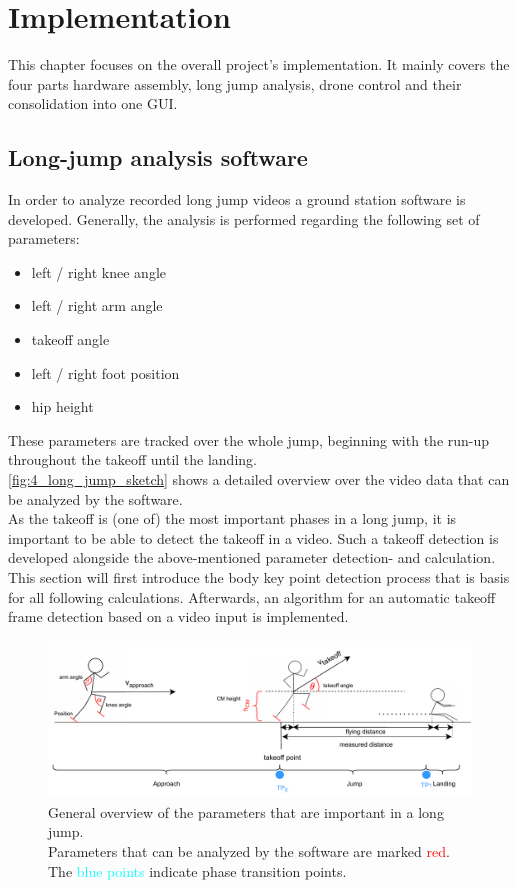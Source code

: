 \graphicspath{{./figures/}}
\chapter{Implementation}
This chapter focuses on the overall project's implementation.
It mainly covers the four parts hardware assembly, long jump analysis,
drone control and their consolidation into one \ac{GUI}.

\section{Long-jump analysis software}\label{sec:4_analysis_software}
In order to analyze recorded long jump videos a ground station software is
developed.
Generally, the analysis is performed regarding the following set of
parameters:
\begin{itemize}
    \item left / right knee angle
    \item left / right arm angle
    \item takeoff angle
    \item left / right foot position
    \item hip height
\end{itemize}
These parameters are tracked over the whole jump, beginning with the run-up
throughout the takeoff until the landing.\\
\autoref{fig:4_long_jump_sketch} shows a detailed overview over the video data
that can be analyzed by the software.\\
As the takeoff is (one of) the most important phases in a long jump, it is
important to be able to detect the takeoff in a video.
Such a takeoff detection is developed alongside the above-mentioned parameter 
detection- and calculation.\\
This section will first introduce the body key point detection process that
is basis for all following calculations.
Afterwards, an algorithm for an automatic takeoff frame detection based on a
video input is implemented.
\begin{figure}[!h]
    \centering
    \includegraphics[scale=0.6]{long_jump_sketch.pdf}
    \caption[Long jump parameter overview]{General overview of the parameters
    that are important in a long jump.\\
    Parameters that can be analyzed by the software are marked
    \textcolor{red}{red}.\\
    The \textcolor{cyan}{blue points} indicate phase transition points.}
    \label{fig:4_long_jump_sketch}
\end{figure}
\FloatBarrier

